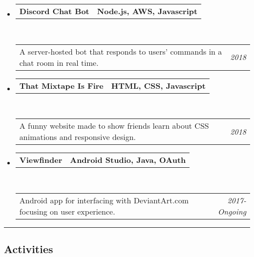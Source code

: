 \documentclass[11pt,letterpaper]{article}
\makeatletter
\newcommand{\headerrow}[2]
{\begin{tabular*}{\linewidth}{l@{\extracolsep{\fill}}r}
	#1 &
	#2 \\
\end{tabular*}}
\makeatother
\begin{document}
\begin{itemize}
	\parskip=0.1em

	\item 
	\headerrow
		{\textbf{Discord Chat Bot}}
		{\textbf{Node.js, AWS, Javascript}}
	\\
	\headerrow
		{A server-hosted bot that responds to users' commands in a chat room in real time.}
		{\emph{2018}}
		
	\item 
	\headerrow
		{\textbf{That Mixtape Is Fire}}
		{\textbf{HTML, CSS, Javascript}}
	\\
	\headerrow
		{A funny website made to show friends learn about CSS animations and responsive design.}
		{\emph{2018}}
	
	\item 
	\headerrow
		{\textbf{Viewfinder}}
		{\textbf{Android Studio, Java, OAuth}}
	\\
	\headerrow
		{Android app for interfacing with DeviantArt.com focusing on user experience.}
		{\emph{2017-Ongoing}}

\end{itemize}

\hrule
\vspace{-0.4em}
\subsection*{Activities}

\end{document}

